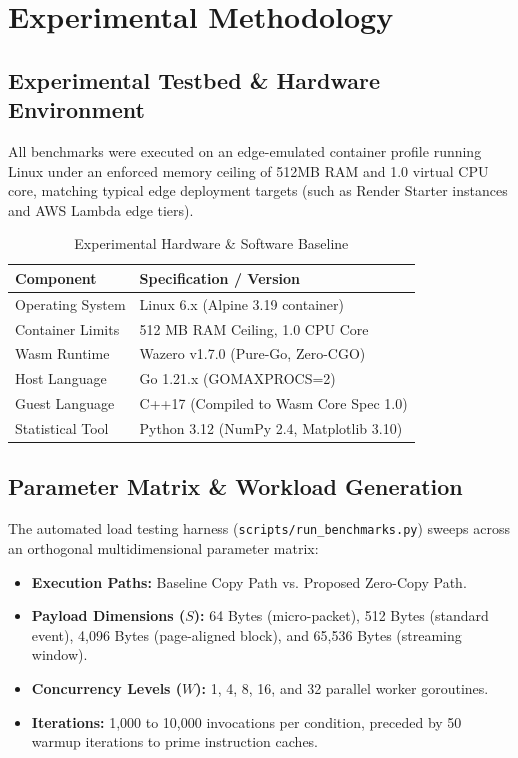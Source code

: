 \section{Experimental Methodology}
\label{sec:methodology}

\subsection{Experimental Testbed & Hardware Environment}
All benchmarks were executed on an edge-emulated container profile running Linux under an enforced memory ceiling of 512MB RAM and 1.0 virtual CPU core, matching typical edge deployment targets (such as Render Starter instances and AWS Lambda edge tiers).

\begin{table}[h]
\centering
\caption{Experimental Hardware & Software Baseline}
\label{tab:hardware_specs}
\small
\begin{tabular}{|l|l|}
\hline
\textbf{Component} & \textbf{Specification / Version} \\ \hline
Operating System   & Linux 6.x (Alpine 3.19 container) \\ \hline
Container Limits   & 512 MB RAM Ceiling, 1.0 CPU Core \\ \hline
Wasm Runtime       & Wazero v1.7.0 (Pure-Go, Zero-CGO) \\ \hline
Host Language      & Go 1.21.x (GOMAXPROCS=2) \\ \hline
Guest Language     & C++17 (Compiled to Wasm Core Spec 1.0) \\ \hline
Statistical Tool   & Python 3.12 (NumPy 2.4, Matplotlib 3.10) \\ \hline
\end{tabular}
\end{table}

\subsection{Parameter Matrix & Workload Generation}
The automated load testing harness (\texttt{scripts/run_benchmarks.py}) sweeps across an orthogonal multidimensional parameter matrix:
\begin{itemize}
    \item \textbf{Execution Paths:} Baseline Copy Path vs. Proposed Zero-Copy Path.
    \item \textbf{Payload Dimensions ($S$):} 64 Bytes (micro-packet), 512 Bytes (standard event), 4,096 Bytes (page-aligned block), and 65,536 Bytes (streaming window).
    \item \textbf{Concurrency Levels ($W$):} 1, 4, 8, 16, and 32 parallel worker goroutines.
    \item \textbf{Iterations:} 1,000 to 10,000 invocations per condition, preceded by 50 warmup iterations to prime instruction caches.
\end{itemize}

